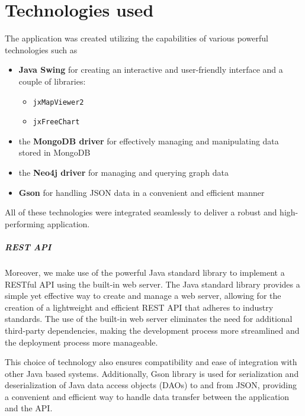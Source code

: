 \chapter{Technologies used}

The application was created utilizing the capabilities of various powerful technologies such as
\begin{itemize}
	\item \textbf{Java Swing} for creating an interactive and user-friendly interface and a couple of libraries:
	
	\begin{itemize}
		\item \texttt{jxMapViewer2}
		
		\item \texttt{jxFreeChart}
	\end{itemize}
	
	\item the \textbf{MongoDB driver} for effectively managing and manipulating data stored in MongoDB
	\item the \textbf{Neo4j driver} for managing and querying graph data
	\item \textbf{Gson} for handling JSON data in a convenient and efficient manner
\end{itemize}
All of these technologies were integrated seamlessly to deliver a robust and high-performing application.

\paragraph{REST API}
Moreover, we make use of the powerful Java standard library to implement a RESTful API using the built-in web server. The Java standard library provides a simple yet effective way to create and manage a web server, allowing for the creation of a lightweight and efficient REST API that adheres to industry standards. The use of the built-in web server eliminates the need for additional third-party dependencies, making the development process more streamlined and the deployment process more manageable. 

This choice of technology also ensures compatibility and ease of integration with other Java based systems. Additionally, Gson library is used for serialization and deserialization of Java data access objects (DAOs) to and from JSON, providing a convenient and efficient way to handle data transfer between the application and the API.


